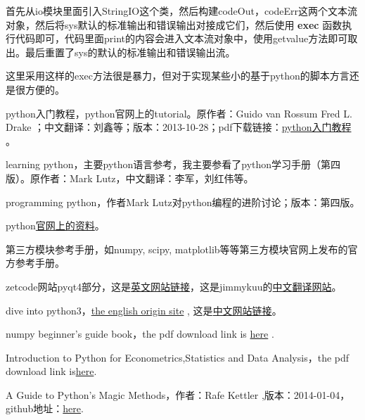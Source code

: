 \documentclass[12pt,oneside]{book}
\begin{document}
\begin{common-format}
首先从io模块里面引入StringIO这个类，然后构建codeOut，codeErr这两个文本流对象，然后将sys默认的标准输出和错误输出对接成它们，然后使用 \textbf{exec} 函数执行代码即可，代码里面print的内容会进入文本流对象中，使用getvalue方法即可取出。最后重置了sys的默认的标准输出和错误输出流。

这里采用这样的exec方法很是暴力，但对于实现某些小的基于python的脚本方言还是很方便的。



\begin{thebibliography}{9}
 python入门教程，python官网上的tutorial。原作者：Guido van Rossum  Fred L. Drake ；中文翻译：刘鑫等；版本：2013-10-28；pdf下载链接：\href{https://drive.google.com/open?id=0ByWxOeitx54PSW40bU5zNVhuMlU&authuser=0}{python入门教程}  。

 learning python，主要python语言参考，我主要参看了python学习手册（第四版）。原作者：Mark Lutz，中文翻译：李军，刘红伟等。

 programming python，作者Mark Lutz对python编程的进阶讨论；版本：第四版。

 python\href{https://docs.python.org/3/}{官网上的资料}。

 第三方模块参考手册，如numpy, scipy, matplotlib等等第三方模块官网上发布的官方参考手册。

 zetcode网站pyqt4部分，这是\href{http://zetcode.com/gui/pyqt4/}{英文网站链接}，这是jimmykuu的\href{http://blog.cx125.com/books/PyQt4_Tutorial/}{中文翻译网站}。

 dive into python3，\href{http://www.diveintopython3.net/index.html}{the english origin site} , 这是\href{http://sebug.net/paper/books/dive-into-python3/index.html}{中文网站链接}。

 numpy beginner's guide book，the pdf download link is \href{https://drive.google.com/open?id=0ByWxOeitx54PNXRIMUVybTlLZDQ&authuser=0}{here} . 

 Introduction to Python for Econometrics,Statistics and Data Analysis，the pdf download link is\href{https://drive.google.com/open?id=0ByWxOeitx54PTXN6RW5ydzQ4YXc&authuser=0}{here}.

 A Guide to Python's Magic Methods，作者：Rafe Kettler ,版本：2014-01-04，github地址：\href{https://github.com/RafeKettler/magicmethods}{here}.


\end{thebibliography}
\end{common-format}
\end{document}
